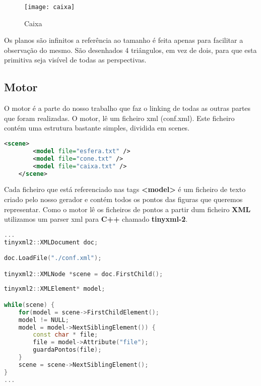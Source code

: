 \documentclass{article}
\begin{document}
\begin{figure}[H]
	\centering
	\texttt{[image: caixa]}
	\caption{Caixa}
\end{figure}

\begin{warn}[Notice:]
Os planos são infinitos a referência ao tamanho é feita apenas para facilitar a observação do mesmo.
São desenhados 4 triângulos, em vez de dois, para que esta primitiva seja visível de todas as perspectivas.
\end{warn}

\newpage
\subsection{Motor}
O motor é a parte do nosso trabalho que faz o linking de todas as outras partes que foram realizadas. O motor, lê um ficheiro xml (conf.xml). Este ficheiro contém uma estrutura bastante simples, dividida em scenes.

\begin{file}
	\begin{lstlisting}[language=XML]
	<scene>
		<model file="esfera.txt" />
		<model file="cone.txt" />
		<model file="caixa.txt" />
	</scene>
	\end{lstlisting}
	\end{file}

Cada ficheiro que está referenciado nas tags \textbf{<model>} é um ficheiro de texto criado pelo nosso gerador e contém todos os pontos das figuras que queremos representar.
Como o motor lê os ficheiros de pontos a partir dum ficheiro \textbf{XML} utilizamos um parser xml para \textbf{C++} chamado \textbf{tinyxml-2}.

\begin{file}
	\begin{lstlisting}[language=C++]
...
tinyxml2::XMLDocument doc;

doc.LoadFile("./conf.xml");

tinyxml2::XMLNode *scene = doc.FirstChild();
		
tinyxml2::XMLElement* model;

while(scene) {
	for(model = scene->FirstChildElement();
	model != NULL; 
	model = model->NextSiblingElement()) {
		const char * file;
		file = model->Attribute("file");
		guardaPontos(file);
	}
	scene = scene->NextSiblingElement();
}
...

	\end{lstlisting}
\end{file}
\end{document}

